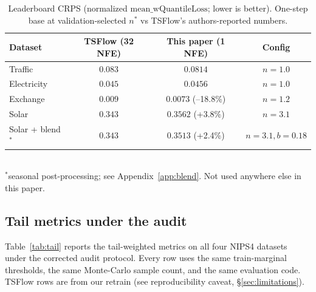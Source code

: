 \documentclass{article}
\begin{document}
\begin{table}[t]
\centering
\caption{Leaderboard CRPS (normalized $\mathrm{mean\_wQuantileLoss}$;
lower is better). One-step base at validation-selected $n^*$ vs
TSFlow's authors-reported numbers.}
\label{tab:leaderboard}
\begin{tabular}{lccc}
\toprule
Dataset & TSFlow (32 NFE) & \textbf{This paper (1 NFE)} & Config \\
\midrule
Traffic            & $0.083$ & $\mathbf{0.0814}$           & $n{=}1.0$ \\
Electricity        & $0.045$ & $\mathbf{0.0456}$           & $n{=}1.0$ \\
Exchange           & $0.009$ & $\mathbf{0.0073}$ (--18.8\%)& $n{=}1.2$ \\
Solar              & $0.343$ & $0.3562$ (+3.8\%)           & $n{=}3.1$ \\
Solar + blend$^{*}$ & $0.343$ & $0.3513$ (+2.4\%)          & $n{=}3.1, b{=}0.18$ \\
\bottomrule
\end{tabular}\\
{\footnotesize $^{*}$seasonal post-processing; see Appendix~\ref{app:blend}.
Not used anywhere else in this paper.}
\end{table}

\subsection{Tail metrics under the audit}
\label{sec:tail-headline}

Table~\ref{tab:tail} reports the tail-weighted metrics on all four
NIPS4 datasets under the corrected audit protocol. Every row uses
the same train-marginal thresholds, the same Monte-Carlo sample
count, and the same evaluation code. TSFlow rows are from our
retrain (see reproducibility caveat, \S\ref{sec:limitations}).
\end{document}
